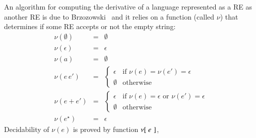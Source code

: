 \documentclass[review]{elsarticle}
\newcommand{\F}[1]{\green{\mathsf{#1}}}
\newcommand{\V}[1]{\purple{\mathit{#1}}}
\begin{document}
An algorithm for computing the derivative of a language represented as
a RE as another RE is due to Brzozowski~\cite{Brzozowski1964} and it
relies on a function (called $\nu$) that determines if some RE accepts
or not the empty string:
\[
    \begin{array}{lcl}
         \nu(\emptyset) & = & \emptyset \\
         \nu(\epsilon)    & = & \epsilon \\
         \nu(a)                & = & \emptyset \\
         \nu(e\,e')           & = & \left\{
                                                 \begin{array}{ll}
                                                      \epsilon &
                                                                 \text{if
                                                                 }\nu(e)
                                                                 =
                                                                 \nu(e')
                                                                 =
                                                                 \epsilon
                                                   \\
                                                   \emptyset &
                                                               \text{otherwise}
                                                 \end{array}
                                             \right. \\
         \nu(e + e')  & = & \left\{
                                         \begin{array}{ll}
                                              \epsilon & \text{if
                                                         }\nu(e) =
                                                         \epsilon
                                                         \text{ or
                                                         }\nu(e') =
                                                         \epsilon \\
                                              \emptyset & \text{otherwise}
                                         \end{array}
                                      \right. \\
         \nu(e^\star) & = & \epsilon
    \end{array}
\]
Decidability of $\nu(e)$ is proved by function \ensuremath{\F{\nu[ }\;\V{e}\;\mskip1.5mu]},
\end{document}
